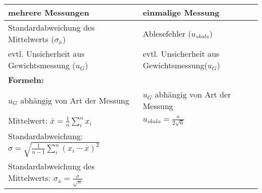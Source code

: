 \documentclass[a4paper, 12pt]{article}
\begin{document}
\begin{tabular}{|l|l|}
\hline
\textbf{mehrere Messungen} & \textbf{einmalige Messung}\\
\hline
Standardabweichung des Mittelwerts ($\sigma_{\bar{x}}$) & Ablesefehler ($u_{skala}$)\\
evtl. Unsicherheit aus Gewichtsmessung ($u_G$)& evtl. Unsicherheit aus Gewichtsmessung($u_G$)\\
\hline
\multicolumn{1}{|l}{\textbf{Formeln:}}& \\
\hline
$u_G$ abhängig von Art der Messung & $u_G$ abhängig von Art der Messung\\
\hline
Mittelwert: $\bar{x} = \frac {1}{n}\sum_{i}^n x_i$ &  $u_{skala} = \frac {a}{2\sqrt{6}}$\\
\hline
Standardabweichung: $\sigma = \sqrt{\frac{1}{n-1}\sum_{i}^n (x_i - \bar{x})^2}$ &  \\
\hline
Standardabweichung des Mittelwerts: $\sigma_{\bar{x}}= \frac{\sigma}{\sqrt{n}}$ & \\
\hline
\end{tabular}
\end{document}
